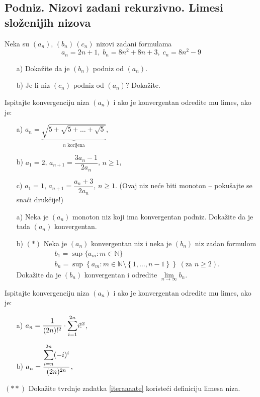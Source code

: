 \subsection*{Podniz. Nizovi zadani rekurzivno. Limesi složenijih nizova}
\begin{exercise} Neka su $(a_n),\,(b_n)\, (c_n)$ nizovi zadani formulama 
$$a_n=2n+1,\;b_n=8n^2+8n+3, \; c_n=8n^2-9$$
\begin{itemize}
\item[a)] Dokažite da je $(b_n)$ podniz od $(a_n)$.
\item[b)] Je li niz $(c_n)$ podniz od $(a_n)$? Dokažite.
\end{itemize}
\end{exercise}
\begin{exercise}
Ispitajte konvergenciju niza $(a_n)$ i ako je konvergentan odredite mu limes, ako je:
\begin{itemize}
\item[a)] $a_n=\underbrace{\sqrt{5+\sqrt{5+\dots+\sqrt{5}}}}_\text{$n$ korijena}$,
\item[b)] $a_1=2$, $a_{n+1}=\dfrac{3a_n-1}{2a_n}$, $n\geq 1$,
\item[c)] $a_1=1$, $a_{n+1}=\dfrac{a_n+3}{2a_n}$, $n\geq 1$. (Ovaj niz neće biti monoton -- pokušajte se snaći drukčije!)
\end{itemize}
\end{exercise}
\begin{exercise} \textbf{}
\begin{itemize}
\item[a)] Neka je $(a_n)$ monoton niz koji ima konvergentan podniz. Dokažite da je tada $(a_n)$ konvergentan.
\item[b)] $(*)$ Neka je $(a_n)$ konvergentan niz i neka je $(b_n)$ niz zadan formulom
\begin{gather*}
b_1=\sup\{a_m : m\in \mathbb{N}\}\\
b_n=\sup\left\{a_m : m\in \mathbb{N}\setminus\left\{1, \dots, n-1\right\}\right\}\;(\text{za }n\geq 2).
\end{gather*}
\noindent Dokažite da je $(b_n)$ konvergentan i odredite $\lim\limits_{n\to \infty}{b_n}$.
\end{itemize}
\end{exercise}
\begin{exercise} Ispitajte konvergenciju niza $(a_n)$ i ako je konvergentan odredite mu limes, ako je:
\begin{itemize}
\item[a)] $a_n=\dfrac{1}{(2n)!^2}\cdot\dsum_{i=1}^{2n}{i!^2}$,
\item[b)] $a_n=\dfrac{\dsum_{i=n}^{2n}{(-i)^i}}{(2n)^{2n}}$,
\end{itemize}
\end{exercise}
\begin{exercise} $(**)$
Dokažite tvrdnje zadatka \ref{iteraaaate} koristeći definiciju limesa niza.
\end{exercise}
